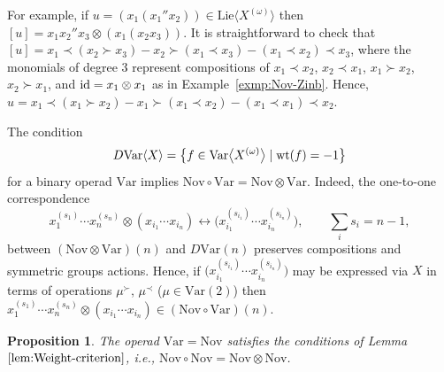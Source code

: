 \documentclass[pdftex]{sigma}
\numberwithin{equation}{section}
\newtheorem{Proposition}[Theorem]{Proposition}
 { \theoremstyle{definition}
\newtheorem{Definition}[Theorem]{Definition}
\newtheorem{Note}[Theorem]{Note}
\newtheorem{Example}[Theorem]{Example}
\newtheorem{Remark}[Theorem]{Remark} }
\def\Var{\mathrm{Var}}
\def\Nov{\mathrm{Nov}}
\def\Lie{\mathrm{Lie}}
\def\wt {\mathop {\fam 0 wt}\nolimits}
\def\id {\mathop {\fam 0 id}\nolimits}
\begin{document}
\begin{Example}%
For example, if $u = (x_1 (x_1''x_2 ) ) \in \Lie\bigl\langle X^{(\omega )}\bigr\rangle $
then $[u] = x_1x_2''x_3 \otimes (x_1(x_2x_3))$.
It is straightforward to check that
$[u] = x_1\prec (x_2\succ x_3) - x_2\succ (x_1\prec x_3) - (x_1\prec x_2)\prec x_3$,
where the monomials of degree 3 represent
compositions of $x_1\prec x_2$, $x_2\prec x_1$, $x_1\succ x_2$, $x_2\succ x_1$, and $\id = x_1\otimes x_1$ as in Example~\ref{exmp:Nov-Zinb}.
Hence,
$u = x_1\prec (x_1\succ x_2) - x_1\succ (x_1\prec x_2) - (x_1\prec x_1)\prec x_2$.
\end{Example}

\begin{Remark}%
The condition
\[
D\Var \langle X\rangle = \bigl\{f\in \Var\bigl\langle X^{(\omega )}\bigr\rangle \mid \wt (f)=-1 \bigr\}
\]
for a binary operad $\Var $
implies $\Nov \circ \Var =\Nov \otimes \Var $.
Indeed, the one-to-one correspondence
\[
x_1^{(s_1)}\cdots x_n^{(s_n)}\otimes (x_{i_1}\cdots x_{i_n}) \leftrightarrow
\bigl(x_{i_1}^{(s_{i_1})} \cdots x_{i_n}^{(s_{i_n})} \bigr),
\qquad
\sum_i s_i = n-1,
\]
between $(\Nov\otimes \Var)(n)$ and $D\Var (n)$
preserves compositions and symmetric groups
actions. Hence, if
$\bigl(x_{i_1}^{(s_{i_1})} \cdots x_{i_n}^{(s_{i_n})} \bigr)$
may be expressed via $X$ in terms of operations
$\mu^\succ$, $\mu^\prec $ ($\mu \in \Var(2)$)
then
$x_1^{(s_1)}\cdots x_n^{(s_n)}\otimes (x_{i_1}\cdots x_{i_n}) \in (\Nov \circ \Var )(n)$.
\end{Remark}

\begin{Proposition}\label{prop:DNovikov}
The operad $\Var = \Nov $ satisfies the conditions of Lemma~$\ref{lem:Weight-criterion}$, i.e.,
$\Nov\circ \Nov = \Nov\otimes \Nov$.
\end{Proposition}
\end{document}
